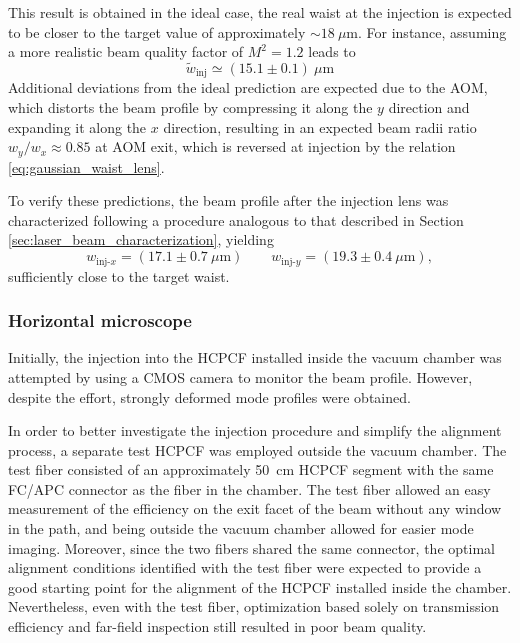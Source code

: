 This result is obtained in the ideal case, the real waist at the injection is expected to be closer to the target value of approximately $\sim18~\mu\mathrm{m}$. For instance, assuming a more realistic beam quality factor of $M^2=1.2$ leads to
\begin{equation*}
    \tilde{w}_\text{inj}\simeq (15.1 \pm 0.1)~\mu\mathrm{m}
\end{equation*}
Additional deviations from the ideal prediction are expected due to the AOM, which distorts the beam profile by compressing it along the $y$ direction and expanding it along the $x$ direction, resulting in an expected beam radii ratio $w_y/w_x\approx0.85$ at AOM exit, which is reversed at injection by the relation \eqref{eq:gaussian_waist_lens}.

To verify these predictions, the beam profile after the injection lens was characterized following a procedure analogous to that described in Section \ref{sec:laser_beam_characterization}, yielding
\begin{equation*}
    w_{\text{inj-}x} = (17.1\pm0.7~\mu\mathrm{m}) \qquad w_{\text{inj-}y} = (19.3\pm0.4~\mu\mathrm{m}),
\end{equation*}
sufficiently close to the target waist.

\subsubsection{Horizontal microscope}

Initially, the injection into the HCPCF installed inside the vacuum chamber was attempted by using a CMOS camera to monitor the beam profile. However, despite the effort, strongly deformed mode profiles were obtained.

In order to better investigate the injection procedure and simplify the alignment process, a separate test HCPCF was employed outside the vacuum chamber. The test fiber consisted of an approximately 50~cm HCPCF segment with the same FC/APC connector as the fiber in the chamber. The test fiber allowed an easy measurement of the efficiency on the exit facet of the beam without any window in the path, and being outside the vacuum chamber allowed for easier mode imaging. Moreover, since the two fibers shared the same connector, the optimal alignment conditions identified with the test fiber were expected to provide a good starting point for the alignment of the HCPCF installed inside the chamber. Nevertheless, even with the test fiber, optimization based solely on transmission efficiency and far-field inspection still resulted in poor beam quality.

